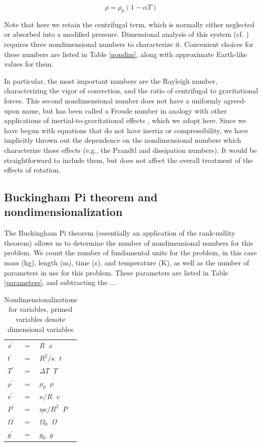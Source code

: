 \documentclass[extra,mreferee]{gji}
\newif\ifdetail
\begin{document}
\begin{equation}
\rho = \rho_0 \left( 1 - \alpha T \right)
\label{eos}
\end{equation}

Note that here we retain the centrifugal term, which is normally either neglected or absorbed into a modified pressure.
Dimensional analysis of this system (cf. \citet{barenblatt1996scaling}) requires three nondimensional numbers to characterize it.
Convenient choices for these numbers are listed in Table \ref{nondim}, along with approximate Earth-like values for them.

In particular, the most important numbers are the Rayleigh number, characterizing the vigor of convection, and the ratio of centrifugal to gravitational forces.
This second nondimensional number does not have a uniformly agreed-upon name, but has been called a Froude number in analogy with other applications of inertial-to-gravitational effects \citep{mckenzie1968influence}, which we adopt here.
Since we have begun with equations that do not have inertia or compressibility, we have implicitly thrown out the dependence on the nondimensional numbers which characterize those effects (e.g., the Prandtl and dissipation numbers).
It would be straightforward to include them, but does not affect the overall treatment of the effects of rotation.

\ifdetail
\subsection{Buckingham Pi theorem and nondimensionalization}
The Buckingham Pi theorem (essentially an application of the rank-nullity theorem) allows us to determine the number of nondimensional numbers for this problem.
We count the number of fundamental units for the problem, in this case mass (kg), length (m), time (s), and temperature (K), as well as the number of parameters in use for this problem.  
These parameters are listed in Table \ref{parameters}, and subtracting the ...

\begin{table}
\centering
\caption{Nondimensionalizations for variables, primed variables denote dimensional variables}
\label{nondim_convert}
\begin{tabular}{@{}lll}
$x^\prime$ &=& $R \;\; x$ \\
$t^\prime$ &=& $R^2/\kappa \;\; t$ \\
$T^\prime$ &=& $\Delta T \;\; T$ \\
$\rho^\prime$ &=& $\rho_0 \;\; \rho$\\
$v^\prime$ &=& $\kappa/R \;\; v$ \\
$P^\prime$ &=& $\eta \kappa/R^2 \;\; P$ \\
$\Omega^\prime$ &=& $\Omega_0 \;\; \Omega$ \\
$g^\prime$ &=& $g_0 \;\; g$
\end{tabular}
\end{table}
\end{document}
